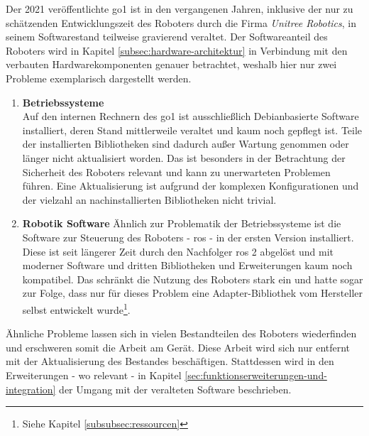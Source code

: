 
Der \num{2021} veröffentlichte \gls{go1} ist in den vergangenen Jahren, inklusive der nur zu schätzenden Entwicklungszeit 
des Roboters durch die Firma \emph{Unitree Robotics}, in seinem Softwarestand teilweise gravierend veraltet.
Der Softwareanteil des Roboters wird in Kapitel \ref{subsec:hardware-architektur} in Verbindung mit den verbauten
Hardwarekomponenten genauer betrachtet, weshalb hier nur zwei Probleme exemplarisch dargestellt werden.

\begin{enumerate}
    \item \textbf{Betriebssysteme}\\
    Auf den internen Rechnern des \gls{go1} ist ausschließlich Debianbasierte Software installiert, deren Stand mittlerweile
    veraltet und kaum noch gepflegt ist.
    Teile der installierten Bibliotheken sind dadurch außer Wartung genommen oder länger nicht aktualisiert worden.
    Das ist besonders in der Betrachtung der Sicherheit des Roboters relevant und kann zu unerwarteten Problemen führen.
    Eine Aktualisierung ist aufgrund der komplexen Konfigurationen und der vielzahl an nachinstallierten Bibliotheken nicht trivial.
    \item \textbf{Robotik Software}
    Ähnlich zur Problematik der Betriebssysteme ist die Software zur Steuerung des Roboters - \gls{ros} - in der ersten
    Version installiert.
    Diese ist seit längerer Zeit durch den Nachfolger \gls{ros} \num{2} abgelöst und mit moderner Software und dritten
    Bibliotheken und Erweiterungen kaum noch kompatibel.
    Das schränkt die Nutzung des Roboters stark ein und hatte sogar zur Folge, dass nur für dieses Problem eine Adapter-Bibliothek
    vom Hersteller selbst entwickelt wurde\footnote{Siehe Kapitel \ref{subsubsec:ressourcen}}.
\end{enumerate}

Ähnliche Probleme lassen sich in vielen Bestandteilen des Roboters wiederfinden und erschweren somit die Arbeit am
Gerät.
Diese Arbeit wird sich nur entfernt mit der Aktualisierung des Bestandes beschäftigen.
Stattdessen wird in den Erweiterungen - wo relevant - in Kapitel \ref{sec:funktionserweiterungen-und-integration} der Umgang mit der veralteten Software beschrieben.



